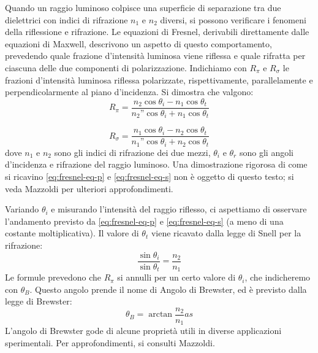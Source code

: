 Quando un raggio luminoso colpisce una superficie di separazione tra due
dielettrici con indici di rifrazione $n_1$ e $n_2$ diversi, si possono verificare
i fenomeni della riflessione e rifrazione.
Le equazioni di Fresnel, derivabili direttamente dalle equazioni di Maxwell, %
descrivono un aspetto di questo comportamento, prevedendo quale frazione d'intensità
luminosa viene riflessa e quale rifratta per ciascuna delle due componenti di
polarizzazione.
Indichiamo con $R_\pi$ e $R_\sigma$ le frazioni d'intensità luminosa riflessa
polarizzate, rispettivamente, parallelamente e perpendicolarmente al piano
d'incidenza.
Si dimostra che valgono:
%
\begin{equation}
  R_\pi = \frac {
    n_2 \cos{\theta_i} - n_1 \cos{\theta_t}
  } {
    n_2” \cos{\theta_i} + n_1 \cos{\theta_t}
  }\label{eq:fresnel-eq-p}
\end{equation}

\begin{equation}
  R_\sigma = \frac {
    n_1 \cos{\theta_i} - n_2 \cos{\theta_t}
  } {
    n_1” \cos{\theta_i} + n_2 \cos{\theta_t}
  }\label{eq:fresnel-eq-s}
\end{equation}
%
\noindent dove $n_1$ e $n_2$ sono gli indici di rifrazione dei due mezzi, $\theta_i$ e
$\theta_r$ sono gli angoli d'incidenza e rifrazione del raggio luminoso.
Una dimostrazione rigorosa di come si ricavino \eqref{eq:fresnel-eq-p} e \eqref{eq:fresnel-eq-s} non è oggetto
di questo testo;
si veda Mazzoldi\cite{mazzoldi98} per ulteriori approfondimenti.

Variando $\theta_i$ e misurando l’intensità del raggio riflesso,
ci aspettiamo di osservare l'andamento previsto da \eqref{eq:fresnel-eq-p} e \eqref{eq:fresnel-eq-s} (a meno di una
costante moltiplicativa).
Il valore di $\theta_t$ viene ricavato dalla legge di Snell per la rifrazione:
%
\begin{equation}
  \frac {\sin{\theta_i}} {\sin{\theta_t}} = \frac {n_2} {n_1}
  \label{eq:legge-snell}
\end{equation}
%
\noindent Le formule prevedono che $R_\pi$ si annulli per un certo valore di $\theta_i$,
che indicheremo con $\theta_B$.
Questo angolo prende il nome di Angolo di Brewster, ed è previsto dalla legge di Brewster:
%
\begin{equation}
  \theta_B = \arctan{
    \frac {n_2} {n_1}as
  }\label{eq:legge-brewster}
\end{equation}
%
\noindent  L’angolo di Brewster gode di alcune proprietà utili in diverse applicazioni
sperimentali.
Per approfondimenti, si consulti Mazzoldi\cite{mazzoldi98}.
\endinput
